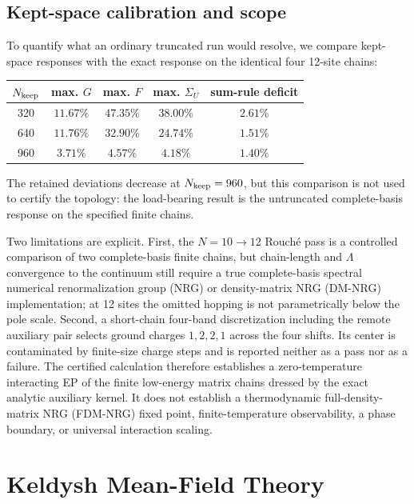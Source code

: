 \documentclass[%
  aps,prb,reprint,amsmath,amssymb,superscriptaddress,longbibliography,floatfix
]{revtex4-2}
\begin{document}
\subsection{Kept-space calibration and scope}

To quantify what an ordinary truncated run would resolve, we compare
kept-space responses with the exact response on the identical four
12-site chains:
\begin{center}
\begin{tabular}{@{}ccccc@{}}
\toprule
\(N_{\rm keep}\) & max. \(G\) & max. \(F\) &
max. \(\Sigma_U\) & sum-rule deficit\\
\midrule
320 & \(11.67\%\) & \(47.35\%\) & \(38.00\%\) & \(2.61\%\)\\
640 & \(11.76\%\) & \(32.90\%\) & \(24.74\%\) & \(1.51\%\)\\
960 & \(3.71\%\) & \(4.57\%\) & \(4.18\%\) & \(1.40\%\)\\
\bottomrule
\end{tabular}
\end{center}
The retained deviations decrease at \(N_{\rm keep}=960\), but this comparison
is not used to certify the topology:
the load-bearing result is the untruncated complete-basis response on the
specified finite chains.

Two limitations are explicit.  First, the $N=10\to12$ Rouch\'e pass is a
controlled comparison of two complete-basis finite chains, but chain-length
and \(\Lambda\) convergence to the continuum still require a true complete-basis spectral numerical
renormalization group (NRG) or density-matrix NRG (DM-NRG)
implementation; at 12 sites the omitted hopping is not parametrically below
the pole scale.  Second, a short-chain four-band discretization including the
remote auxiliary pair selects ground charges \(1,2,2,1\) across the four
shifts.  Its center is contaminated by finite-size charge steps and is
reported neither as a pass nor as a failure.  The certified calculation
therefore establishes a zero-temperature interacting EP of the finite
low-energy matrix chains dressed by the exact analytic auxiliary kernel.  It
does not establish a thermodynamic full-density-matrix NRG (FDM-NRG) fixed
point, finite-temperature
observability, a phase boundary, or universal interaction scaling.

\section{Keldysh Mean-Field Theory}
\label{app:keldysh}
\end{document}
